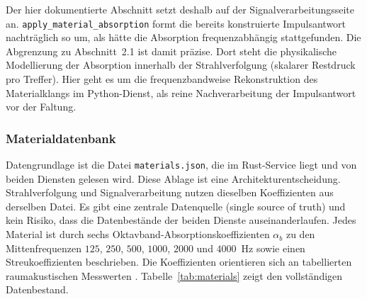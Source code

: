 Der hier dokumentierte Abschnitt setzt deshalb auf der Signalverarbeitungsseite
an. \texttt{apply\_material\_absorption} formt die bereits konstruierte
Impulsantwort nachträglich so um, als hätte die Absorption frequenzabhängig
stattgefunden. Die Abgrenzung zu Abschnitt~2.1 ist damit präzise. Dort steht die
physikalische Modellierung der Absorption innerhalb der Strahlverfolgung
(skalarer Restdruck pro Treffer). Hier geht es um die frequenzbandweise
Rekonstruktion des Materialklangs im Python-Dienst, als reine Nachverarbeitung
der Impulsantwort vor der Faltung.

\subsubsection{Materialdatenbank}
\label{subsubsec:materialdb}

Datengrundlage ist die Datei \texttt{materials.json}, die im Rust-Service liegt
und von beiden Diensten gelesen wird. Diese Ablage ist eine
Architekturentscheidung. Strahlverfolgung und Signalverarbeitung nutzen dieselben
Koeffizienten aus derselben Datei. Es gibt eine zentrale Datenquelle (single
source of truth) und kein Risiko, dass die Datenbestände der beiden Dienste
auseinanderlaufen. Jedes Material ist durch sechs Oktavband-Absorptionskoeffizienten
$\alpha_b$ zu den Mittenfrequenzen $125$, $250$, $500$, $1000$, $2000$ und
$4000$~Hz sowie einen Streukoeffizienten beschrieben. Die Koeffizienten
orientieren sich an tabellierten raumakustischen Messwerten \parencite{kuttruff2016}.
Tabelle~\ref{tab:materials} zeigt den vollständigen Datenbestand.

